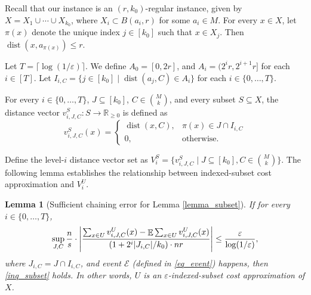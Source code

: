 \documentclass[11pt,letterpaper]{article}
\newtheorem{lemma}[theorem]{Lemma}
\theoremstyle{definition}
\newcommand{\eps}{\varepsilon}
\DeclareMathOperator*{\E}{\ensuremath{\mathbb{E}}}
\DeclareMathOperator{\dist}{dist}
\DeclarePairedDelimiter{\abs}{\lvert}{\rvert}
\begin{document}
Recall that our instance is an $(r,k_0)$-regular instance, given by $X=X_1\cup\cdots\cup X_{k_0}$, where $X_i\subset B(a_i,r)$ for some $a_i\in M$. For every $x\in X$, let $\pi(x)$ denote the unique index $j\in [k_0]$ such that $x\in X_j$. Then $\dist(x,a_{\pi(x)})\leq r$.

Let $T=\lceil \log(1/\eps)\rceil$. We define $A_0=[0,2r]$, and $A_i=(2^i r,2^{i+1}r]$ for each $i\in [T]$. Let $I_{i,C}=\{j\in [k_0]\mid \dist(a_j,C)\in A_i\}$ for each $i\in \{0,\dots,T\}$.

For every $i\in \{0,\dots,T\}$, $J\subseteq [k_0]$, $C\in \binom{M}{k}$, and every subset $S\subseteq X$, the distance vector $v_{i,J,C}^S:S\rightarrow \mathbb{R}_{\geq 0}$ is defined as
\[
v^S_{i,J,C}(x)=
\begin{cases}
    \dist(x,C), & \pi(x)\in J\cap I_{i,C} \\
    0, & \text{otherwise}.
\end{cases}
\]

Define the level-$i$ distance vector set as $V^S_{i}=\{v^S_{i,J,C}\mid J\subseteq [k_0],C\in \binom{M}{k}\}$. The following lemma establishes the relationship between indexed-subset cost approximation and $V_i^U$.

\begin{lemma}[Sufficient chaining error for Lemma \ref{lemma_subset}]
\label{lemma_relate} 
If for every $i\in \{0,\dots,T\}$, 
\begin{equation} \label{inq_chaining}
\sup_{J,C} \frac{n}{s}\cdot \abs*{ \frac{\sum_{x\in U} v^U_{i,J,C}(x)-\E \sum_{x\in U} v^U_{i,J,C}(x)}{(1+2^i|J_{i,C}|/k_0)\cdot nr} }
\leq \frac{\eps}{\log(1/\eps)},
\end{equation}
where $J_{i,C}=J\cap I_{i,C}$,
and event $\mathcal{E}$ (defined in \eqref{eq_event}) happens, then \eqref{inq_subset} holds. 
%
In other words, $U$ is an $\eps$-indexed-subset cost approximation of $X$.
\end{lemma}
\end{document}
